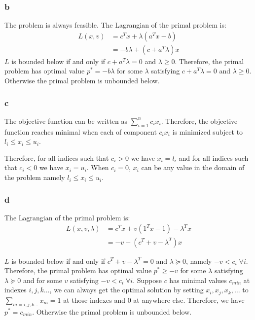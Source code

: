 \documentclass[10pt,a4paper]{article}
\begin{document}
\subsubsection{b}
The problem is always feasible. The Lagrangian of the primal
problem is:
\begin{align*}
  L(x,v) &= c^Tx + \lambda(a^Tx-b)\\
         &= -b\lambda+(c+a^T\lambda)x
\end{align*}
$L$ is bounded below if and only if $c+a^T\lambda=0$ and
$\lambda\geq0$. Therefore, the primal problem has optimal value
$p^*=-b\lambda$ for some $\lambda$ satisfying $c+a^T\lambda=0$ and
$\lambda\geq0$. Otherwise the primal problem is unbounded below.

\subsubsection{c}

The objective function can be written as
$\sum_{i=1}^nc_ix_i$. Therefore, the objective function
reaches minimal when each of component $c_ix_i$ is
minimized subject to $l_i\leq x_i\leq u_i$.

Therefore, for all indices such that $c_i>0$ we have
$x_i=l_i$ and for all indices such that $c_i<0$ we have
$x_i=u_i$. When $c_i=0$, $x_i$ can be any value in the
domain of the problem namely $l_i\leq x_i\leq u_i$.

\subsubsection{d}

The Lagrangian of the primal problem is:
\begin{align*}
  L(x,v,\lambda) &= c^Tx + v(1^Tx-1)-\lambda^Tx\\
         &= -v+(c^T+v-\lambda^T)x
\end{align*}

$L$ is bounded below if and only if $c^T+v-\lambda^T=0$ and
$\lambda\succeq0$, namely $-v< c_i \;\forall i$. Therefore,
the primal problem has optimal value $p^*\geq -v$ for some
$\lambda$ satisfying $\lambda\succeq0$ and for some $v$
satisfying $-v <c_i\;\forall i$. Suppose $c$ has minimal
values $c_{min}$ at indexes $i,j,k\dots$, we can always get
the optimal solution by setting $x_i, x_j, x_k,\dots$ to
$\sum_{m=i,j,k\dots}x_m=1$ at those indexes and $0$ at
anywhere else. Therefore, we have $p^*=c_{min}$. Otherwise
the primal problem is unbounded below.
\end{document}
